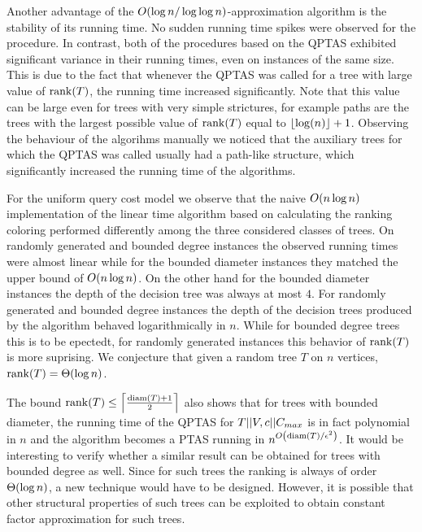 Another advantage of the $O\mathopen{}\left( \log n/\log \log n \right)$-approximation algorithm is the stability of its running time. No sudden running time spikes were observed for the procedure. In contrast, both of the procedures based on the QPTAS exhibited significant variance in their running times, even on instances of the same size. This is due to the fact that whenever the QPTAS was called for a tree with large value of $\operatorname{rank}\mathopen{}\left( T \right)$, the running time increased significantly. Note that this value can be large even for trees with very simple strictures, for example paths are the trees with the largest possible value of $\operatorname{rank}\mathopen{}\left( T \right)$ equal to $\mathopen{}\left\lfloor \log\mathopen{}\left( n \right) \right\rfloor+1$. Observing the behaviour of the algorihms manually we noticed that the auxiliary trees for which the QPTAS was called usually had a path-like structure, which significantly increased the running time of the algorithms. 


For the uniform query cost model we observe that the naive $O\mathopen{}\left( n\log n \right)$ implementation of the linear time algorithm based on calculating the ranking coloring performed differently among the three considered classes of trees. On randomly generated and bounded degree instances the observed running times were almost linear while for the bounded diameter instances they matched the upper bound of $O\mathopen{}\left( n\log n \right)$. On the other hand for the bounded diameter instances the depth of the decision tree was always at most $4$. For randomly generated and bounded degree instances the depth of the decision trees produced by the algorithm behaved logarithmically in $n$. While for bounded degree trees this is to be epectedt, for randomly generated instances this behavior of $\operatorname{rank}\mathopen{}\left( T \right)$ is more suprising. We conjecture that given a random tree $T$ on $n$ vertices, $\operatorname{rank}\mathopen{}\left( T \right)=\Theta\mathopen{}\left( \log n \right)$. 

The bound $\operatorname{rank}\mathopen{}\left( T \right)\leq \mathopen{}\left\lceil \frac{\operatorname{diam}\mathopen{}\left( T \right)+1}{2} \right\rceil$ also shows that for trees with bounded diameter, the running time of the QPTAS for $T||V,c||C_{max}$ is in fact polynomial in $n$ and the algorithm becomes a PTAS running in $n^{O\mathopen{}\left( \operatorname{diam}\mathopen{}\left( T \right)/\epsilon^2 \right)}$. It would be interesting to verify whether a similar result can be obtained for trees with bounded degree as well. Since for such trees the ranking is always of order $\Theta\mathopen{}\left( \log n \right)$, a new technique would have to be designed. However, it is possible that other structural properties of such trees can be exploited to obtain constant factor approximation for such trees.

